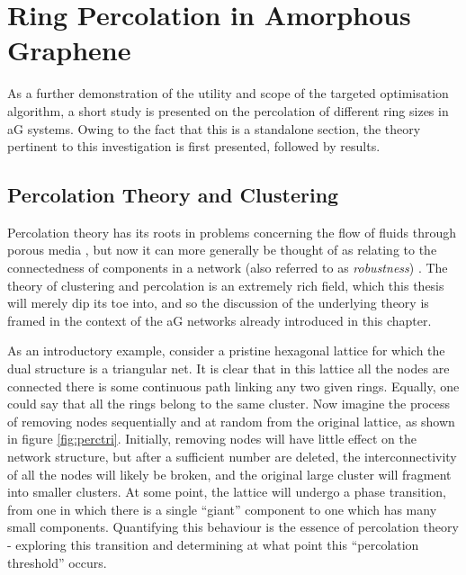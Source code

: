 \section{Ring Percolation in Amorphous Graphene}

As a further demonstration of the utility and scope of the targeted optimisation algorithm, a short study is presented on the percolation of different ring sizes in aG systems.
Owing to the fact that this is a standalone section, the theory pertinent to this investigation is first presented, followed by results.

\subsection{Percolation Theory and Clustering}
\label{s:percolationtheory}

Percolation theory has its roots in problems concerning the flow of fluids through porous media \cite{Broadbent1956}, but now it can more generally be thought of as relating to the connectedness of components in a network (also referred to as \textit{robustness}) \cite{Callaway2000}.
The theory of clustering and percolation is an extremely rich field, which this thesis will merely dip its toe into, and so the discussion of the underlying theory is framed in the context of the aG networks already introduced in this chapter.

As an introductory example, consider a pristine hexagonal lattice for which the dual structure is a triangular net.
It is clear that in this lattice all the nodes are connected \ie{} there is some continuous path linking any two given rings.
Equally, one could say that all the rings belong to the same cluster.
Now imagine the process of removing nodes sequentially and at random from the original lattice, as shown in figure \ref{fig:perctri}.
Initially, removing nodes will have little effect on the network structure, but after a sufficient number are deleted, the interconnectivity of all the nodes will likely be broken, and the original large cluster will fragment into smaller clusters.
At some point, the lattice will undergo a phase transition, from one in which there is a single ``giant'' component to one which has many small components.
Quantifying this behaviour is the essence of percolation theory \-- exploring this transition and determining at what point this ``percolation threshold'' occurs.

